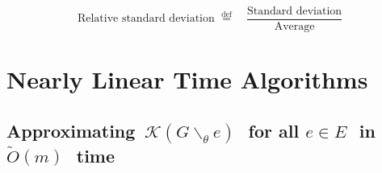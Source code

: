\documentclass[12pt]{beamer}
\def\defeq{\stackrel{\mathrm{def}}{=}}
\newcommand{\bsk}{\backslash_\theta}
\begin{document}
\begin{spacing}{1.3}
{\begin{figure}
{\begin{subfigure}[H]{0.6\textwidth}
	\end{subfigure}
	}
	\vspace{5pt}
	\end{figure}
	\[
		\text{Relative standard deviation} \,\,\defeq \quad \frac{\text{Standard deviation}}{\text{Average}}
	\]
}

\section{Nearly Linear Time Algorithms}

\subsection{Approximating\, \footnotesize$%
	\mathcal{K}(G\bsk e)$\,\small\ for
	all \footnotesize$e \in E$\,\small\  in\,\ 
	\footnotesize$\widetilde{O}(m)$\,\small\ time}



			


\end{spacing}
\end{document}
